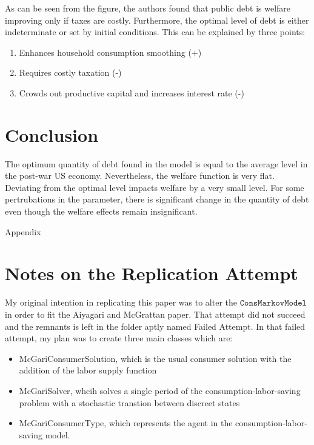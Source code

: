 \documentclass[titlepage,letterpaper]{\econtex}
\begin{document}
  As can be seen from the figure, the authors found that public debt is welfare improving only if taxes are costly. Furthermore, the optimal level of debt is either indeterminate or set by initial conditions. This can be explained by three points:
  \begin{enumerate}
    \item Enhances household consumption smoothing (+)
    \item Requires costly taxation (-)
    \item Crowds out productive capital and increases interest rate (-)
   \end{enumerate}

\hypertarget{LCandCCIntro}{}

\section{Conclusion}

The optimum quantity of debt found in the model is equal to the average level in the post-war US economy. Nevertheless, the welfare function is very flat. Deviating from the optimal level impacts welfare by a very small level. For some pertrubations in the parameter, there is significant change in the quantity of debt even though the welfare effects remain insignificant.

\vfill\eject
\appendix

\centerline{\LARGE Appendix}
\medskip

\hfill

\section{Notes on the Replication Attempt}\label{sec:Notes}

My original intention in replicating this paper was to alter the  $\texttt{ConsMarkovModel}$ in order to fit the Aiyagari and McGrattan paper. That attempt did not succeed and the remnants is left in the folder aptly named Failed Attempt. In that failed attempt, my plan was to create three main classes which are:
\begin{itemize}
\item McGariConsumerSolution, which is the usual consumer solution with the addition of the labor supply function
\item McGariSolver, whcih solves a single period of the consumption-labor-saving problem with a stochastic transtion between discreet states
\item McGariConsumerType, which represents the agent in the consumption-labor-saving model.
\end{itemize}
\end{document}
